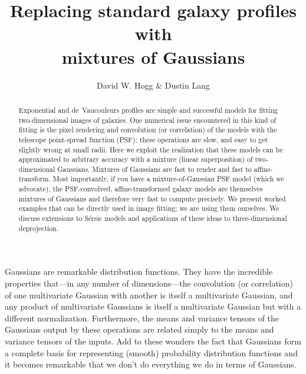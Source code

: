 \documentclass[12pt,pdftex,preprint]{aastex}
\begin{document}
\title{Replacing standard galaxy profiles with \\ mixtures of Gaussians}
\author{David W. Hogg \&
        Dustin Lang}

\begin{abstract}
Exponential and de~Vaucouleurs profiles are simple and successful
models for fitting two-dimensional images of galaxies.  One numerical
issue encountered in this kind of fitting is the pixel rendering and
convolution (or correlation) of the models with the telescope
point-spread function (PSF); these operations are slow, and easy to
get slightly wrong at small radii.  Here we exploit the realization
that these models can be approximated to arbitrary accuracy with a
mixture (linear superposition) of two-dimensional Gaussians.  Mixtures
of Gaussians are fast to render and fast to affine-transform.  Most
importantly, if you have a mixture-of-Gaussian PSF model (which we
advocate), the PSF-convolved, affine-transformed galaxy models are
themselves mixtures of Gaussians and therefore very fast to compute
precisely.  We present worked examples that can be directly used in
image fitting; we are using them ourselves.  We discuss extensions to
S\'ersic models and applications of these ideas to three-dimensional
deprojection.
\end{abstract}

Gaussians are remarkable distribution functions.  They have the
incredible properties that---in any number of dimensions---the
convolution (or correlation) of one multivariate Gaussian with another
is itself a multivariate Gaussian, and any product of multivariate
Gaussians is itself a multivariate Gaussian but with a different
normalization.  Furthermore, the means and variance tensors of the
Gaussians output by these operations are related simply to the means
and variance tensors of the inputs.  Add to these wonders the fact
that Gaussians form a complete basis for representing (smooth)
probability distribution functions and it becomes remarkable that we
don't do everything we do in terms of Gaussians.
\end{document}

